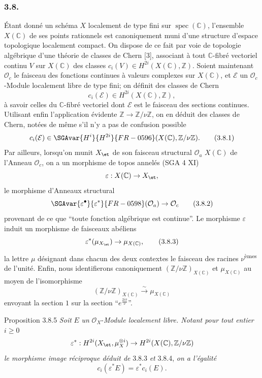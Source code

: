 \subsubsection*{3.8.}
Étant donné un schéma $X$ localement de type fini sur $\operatorname{spec}(\mathbb{C})$, l'ensemble $X(\mathbb{C})$ de ses points rationnels est canoniquement muni d'une structure d'espace topologique localement compact. On dispose de ce fait par voie de topologie algébrique d'une théorie de classes de Chern [3], associant à tout $\mathbb{C}$-fibré vectoriel continu $V$ sur $X(\mathbb{C})$ des classes $c_i(V)\in H^{2i}(X(\mathbb{C}),\mathbb{Z})$. Soient maintenant $\mathcal{O}_c$ le faisceau des fonctions continues à valeurs complexes sur $X(\mathbb{C})$, et $\mathcal{E}$ un $\mathcal{O}_c$-Module localement libre de type fini; on définit des classes de Chern
\[
c_i(\mathcal{E})\in H^{2i}(X(\mathbb{C}),\mathbb{Z}),
\]
à savoir celles du $\mathbb{C}$-fibré vectoriel dont $\mathcal{E}$ est le faisceau des sections continues. Utilisant enfin l'application évidente $\mathbb{Z}\to\mathbb{Z}/\nu\mathbb{Z}$, on en déduit des classes de Chern, notées de même s'il n'y a pas de confusion possible
\[
c_i(\mathcal{E})\in \SGAvar{H^i}{H^{2i}}{FR-0596}(X(\mathbb{C}),\mathbb{Z}/\nu\mathbb{Z}).
\tag{3.8.1}
\]
Par
ailleurs, lorsqu'on munit $X_{\et}$ de son faisceau structural $\mathcal{O}_a$  $X(\mathbb{C})$ de l'Anneau $\mathcal{O}_c$, on a un morphisme de topos annelés (SGA 4 XI)
\[
\varepsilon:X(\mathbb{C})\to X_{\et},
\]
le morphisme d'Anneaux structural
\[
\SGAvar{\varepsilon^{\bullet}}{\varepsilon^*}{FR-0598}(\mathcal{O}_a)\to\mathcal{O}_c
\tag{3.8.2}
\]
provenant de ce que ``toute fonction algébrique est continue''. Le morphisme $\varepsilon$ induit un morphisme de faisceaux abéliens
\[
\varepsilon^*(\mu_{X_{\et}})\to \mu_{X(\mathbb{C})},
\tag{3.8.3}
\]
la lettre $\mu$ désignant dans chacun des deux contextes le faisceau des racines $\nu$\textsuperscript{èmes} de l'unité. Enfin, nous identifierons canoniquement $(\mathbb{Z}/\nu\mathbb{Z})_{X(\mathbb{C})}$ et $\mu_{X(\mathbb{C})}$ au moyen de l'isomorphisme
\[
(\mathbb{Z}/\nu\mathbb{Z})_{X(\mathbb{C})}
 \xrightarrow{\sim}\mu_{X(\mathbb{C})}
\tag{3.8.4}
\]
envoyant la section $1$ sur la section ``$e^{\frac{2i\pi}{\nu}}$''.

\begin{statement}{Proposition 3.8.5}
\emph{Soit} $E$ \emph{un} $\mathcal{O}_X$-\emph{Module localement libre. Notant pour tout entier} $i\ge0$
\[
\varepsilon^*:H^{2i}(X_{\et},\mu_X^{\otimes i})
\to H^{2i}(X(\mathbb{C}),\mathbb{Z}/\nu\mathbb{Z})
\]
\emph{le morphisme image réciproque déduit de} 3.8.3 \emph{et} 3.8.4, \emph{on a l'égalité}
\[
c_i(\varepsilon^*E)=\varepsilon^*c_i(E).
\]
\end{statement}

